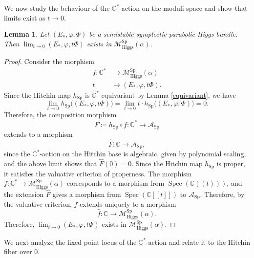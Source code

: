 \documentclass[11pt, reqno]{amsart}
\numberwithin{equation}{section}
\newtheorem{lemma}[theorem]{Lemma}
\theoremstyle{definition}
\begin{document}
We now study the behaviour of the $\mathbb{C}^*$-action on the moduli space and show that limits exist as $t \to 0$.
\begin{lemma}\label{limit1}
Let $(E_*,\varphi,\Phi)$ be a semistable symplectic parabolic Higgs bundle. Then $\lim_{t\to 0} (E_*,\varphi,t\Phi)$ exists in $\mathcal{M}^{\mathrm{Sp}}_{\mathrm{Higgs}}(\alpha)$.
\end{lemma}
\begin{proof}
Consider the morphism 
\begin{align*}
    f: \mathbb{C}^* &\longrightarrow \mathcal{M}^{\mathrm{Sp}}_{\mathrm{Higgs}}(\alpha)\\
    t &\longmapsto (E_*,\varphi,t\Phi).
\end{align*}
Since the Hitchin map $h_{\mathrm{Sp}}$ is $\mathbb{C}^*$-equivariant by Lemma \ref{equivariant}, we have
\[
\lim_{t\to 0} h_{\mathrm{Sp}}\big((E_*,\varphi,t\Phi)\big) = \lim_{t \to 0} t \cdot h_{\mathrm{Sp}}\big((E_*,\varphi,\Phi)\big) = 0.
\]
Therefore, the composition morphism 
$$F \coloneqq h_{\mathrm{Sp}} \circ f : \mathbb{C}^* \longrightarrow \mathcal{A}_{\mathrm{Sp}}$$ 
extends to a morphism 
$$\hat{F} : \mathbb{C} \longrightarrow \mathcal{A}_{\mathrm{Sp}},$$ 
since the $\mathbb{C}^*$-action on the Hitchin base is algebraic, given by polynomial scaling, and the above limit shows that $\hat F(0)=0$. Since the Hitchin map $h_{\mathrm{Sp}}$ is proper, it satisfies the valuative criterion of properness. The morphism $f : \mathbb{C}^* \to \mathcal{M}^{\mathrm{Sp}}_{\mathrm{Higgs}}(\alpha)$ corresponds to a morphism from $\operatorname{Spec}(\mathbb{C}((t)))$, and the extension $\hat{F}$ gives a morphism from $\operatorname{Spec}(\mathbb{C}[[t]])$ to $\mathcal{A}_{\mathrm{Sp}}$. Therefore, by the valuative criterion, $f$ extends uniquely to a morphism
\[
\hat{f}: \mathbb{C} \longrightarrow \mathcal{M}^{\mathrm{Sp}}_{\mathrm{Higgs}}(\alpha).
\] Therefore, $\lim_{t\to 0} (E_*,\varphi,t\Phi)$ exists in $\mathcal{M}^{\mathrm{Sp}}_{\mathrm{Higgs}}(\alpha)$.
\end{proof}

We next analyze the fixed point locus of the $\mathbb{C}^*$-action and relate it to the Hitchin fiber over $0$.
\end{document}
